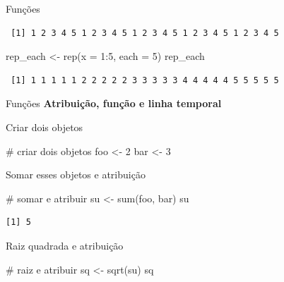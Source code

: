\documentclass[
  ignorenonframetext,
]{beamer}
\newenvironment{Shaded}{\begin{snugshade}}{\end{snugshade}}
\newcommand{\AttributeTok}[1]{\textcolor[rgb]{0.40,0.45,0.13}{#1}}
\newcommand{\CommentTok}[1]{\textcolor[rgb]{0.37,0.37,0.37}{#1}}
\newcommand{\DecValTok}[1]{\textcolor[rgb]{0.68,0.00,0.00}{#1}}
\newcommand{\FunctionTok}[1]{\textcolor[rgb]{0.28,0.35,0.67}{#1}}
\newcommand{\NormalTok}[1]{\textcolor[rgb]{0.00,0.23,0.31}{#1}}
\newcommand{\OtherTok}[1]{\textcolor[rgb]{0.00,0.23,0.31}{#1}}
\newcommand{\SpecialCharTok}[1]{\textcolor[rgb]{0.37,0.37,0.37}{#1}}
\begin{document}
\begin{frame}[fragile]
\begin{block}{Funções}
\begin{verbatim}
 [1] 1 2 3 4 5 1 2 3 4 5 1 2 3 4 5 1 2 3 4 5 1 2 3 4 5
\end{verbatim}

\pause

\begin{Shaded}
\begin{Highlighting}[]
\NormalTok{rep\_each }\OtherTok{\textless{}{-}} \FunctionTok{rep}\NormalTok{(}\AttributeTok{x =} \DecValTok{1}\SpecialCharTok{:}\DecValTok{5}\NormalTok{, }\AttributeTok{each =} \DecValTok{5}\NormalTok{)}
\NormalTok{rep\_each}
\end{Highlighting}
\end{Shaded}

\begin{verbatim}
 [1] 1 1 1 1 1 2 2 2 2 2 3 3 3 3 3 4 4 4 4 4 5 5 5 5 5
\end{verbatim}
\end{block}

\begin{block}{Funções}
\protect\hypertarget{funuxe7uxf5es-6}{}
\textbf{Atribuição, função e linha temporal}

Criar dois objetos

\begin{Shaded}
\begin{Highlighting}[]
\CommentTok{\# criar dois objetos}
\NormalTok{foo }\OtherTok{\textless{}{-}} \DecValTok{2}
\NormalTok{bar }\OtherTok{\textless{}{-}} \DecValTok{3}
\end{Highlighting}
\end{Shaded}

Somar esses objetos e atribuição

\begin{Shaded}
\begin{Highlighting}[]
\CommentTok{\# somar e atribuir}
\NormalTok{su }\OtherTok{\textless{}{-}} \FunctionTok{sum}\NormalTok{(foo, bar)}
\NormalTok{su}
\end{Highlighting}
\end{Shaded}

\begin{verbatim}
[1] 5
\end{verbatim}

Raiz quadrada e atribuição

\begin{Shaded}
\begin{Highlighting}[]
\CommentTok{\# raiz e atribuir}
\NormalTok{sq }\OtherTok{\textless{}{-}} \FunctionTok{sqrt}\NormalTok{(su)}
\NormalTok{sq}
\end{Highlighting}
\end{Shaded}


\end{block}
\end{frame}
\end{document}
